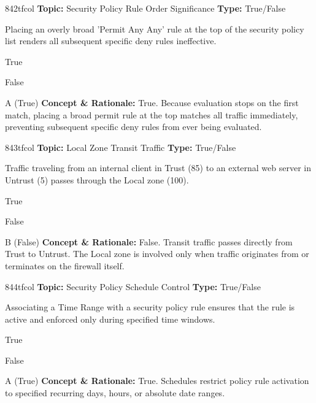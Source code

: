 \begin{qcard}{842}{tfcol}
\textcolor{darkslate!75}{\small\textbf{Topic:} Security Policy Rule Order Significance \hfill \textbf{Type:} True/False}\vspace{0.4em}\par
Placing an overly broad 'Permit Any Any' rule at the top of the security policy list renders all subsequent specific deny rules ineffective.
\begin{qoptions}
\item True
\item False
\end{qoptions}
\end{qcard}
\nopagebreak
\begin{explainbox}{A (True)}
\textbf{Concept \& Rationale:} True. Because evaluation stops on the first match, placing a broad permit rule at the top matches all traffic immediately, preventing subsequent specific deny rules from ever being evaluated.
\end{explainbox}

\begin{qcard}{843}{tfcol}
\textcolor{darkslate!75}{\small\textbf{Topic:} Local Zone Transit Traffic \hfill \textbf{Type:} True/False}\vspace{0.4em}\par
Traffic traveling from an internal client in Trust (85) to an external web server in Untrust (5) passes through the Local zone (100).
\begin{qoptions}
\item True
\item False
\end{qoptions}
\end{qcard}
\nopagebreak
\begin{explainbox}{B (False)}
\textbf{Concept \& Rationale:} False. Transit traffic passes directly from Trust to Untrust. The Local zone is involved only when traffic originates from or terminates on the firewall itself.
\end{explainbox}

\begin{qcard}{844}{tfcol}
\textcolor{darkslate!75}{\small\textbf{Topic:} Security Policy Schedule Control \hfill \textbf{Type:} True/False}\vspace{0.4em}\par
Associating a Time Range with a security policy rule ensures that the rule is active and enforced only during specified time windows.
\begin{qoptions}
\item True
\item False
\end{qoptions}
\end{qcard}
\nopagebreak
\begin{explainbox}{A (True)}
\textbf{Concept \& Rationale:} True. Schedules restrict policy rule activation to specified recurring days, hours, or absolute date ranges.
\end{explainbox}

